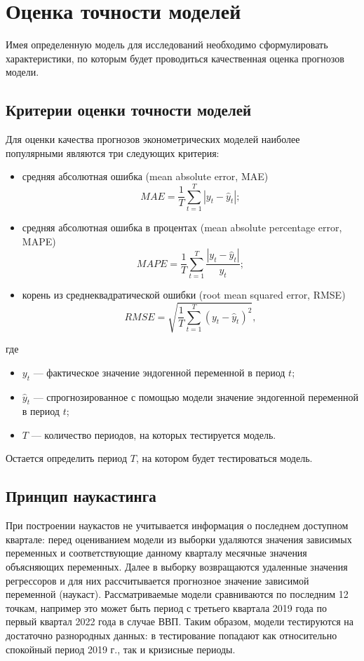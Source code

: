 \documentclass[a4paper, 14pt]{extreport}
\numberwithin{equation}{section}
\numberwithin{equation}{section}
\begin{document}
	\section{Оценка точности моделей}
	Имея определенную модель для исследований необходимо сформулировать характеристики, по которым будет проводиться качественная оценка прогнозов модели.
	\subsection{Критерии оценки точности моделей}
	Для оценки качества прогнозов эконометрических моделей наиболее популярными являются три следующих критерия: 
	\begin{itemize}
		\item средняя абсолютная ошибка (mean absolute error, MAE) 
		\begin{equation}
			MAE = \dfrac{1}{T}\sum_{t=1}^{T}|y_t - \hat y _t|;
		\end{equation}
		\item средняя абсолютная ошибка в процентах (mean absolute percentage error, MAPE)
		\begin{equation}
			MAPE = \dfrac{1}{T}\sum_{t=1}^{T}\dfrac{|y_t - \hat y _t|}{y_t};
		\end{equation}
		\item корень из среднеквадратической ошибки (root mean squared error, RMSE)
		\begin{equation}
			RMSE = \sqrt{\dfrac{1}{T}\sum_{t=1}^{T}(y_t - \hat y_t)^2},
		\end{equation}
	\end{itemize}
	где
	\begin{itemize}
		\item $y_t$ --- фактическое значение эндогенной переменной в период $t$;
		\item $\hat y _t$ --- спрогнозированное с помощью модели значение эндогенной переменной в период $t$;
		\item $T$ --- количество периодов, на которых тестируется модель.
	\end{itemize}  	
	Остается определить период $T$, на котором будет тестироваться модель.
	\subsection{Принцип наукастинга}
	При построении наукастов не учитывается информация о последнем доступном квартале: перед оцениванием модели из выборки удаляются значения зависимых переменных и соответствующие данному кварталу месячные значения объясняющих переменных. Далее в выборку возвращаются удаленные значения регрессоров и для них рассчитывается прогнозное значение зависимой переменной (наукаст). Рассматриваемые модели сравниваются по последним 12 точкам, например это может быть период с третьего квартала 2019 года по первый квартал 2022 года в случае ВВП. Таким образом, модели тестируются на достаточно разнородных данных: в тестирование попадают как относительно спокойный период 2019 г., так и кризисные периоды.
	
\end{document}
